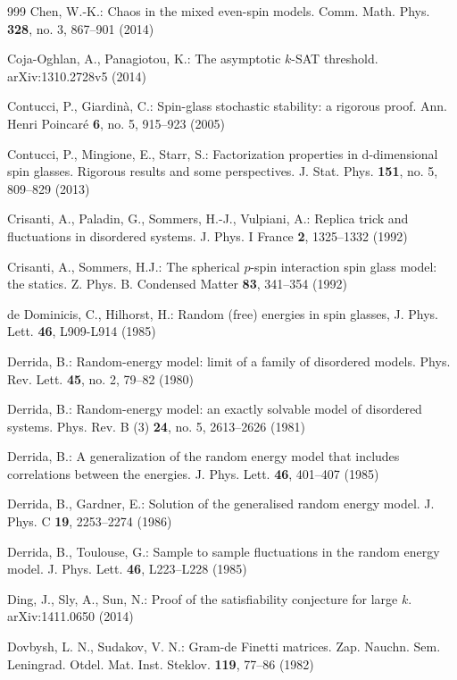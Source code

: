 \documentclass[12pt]{article}
\theoremstyle{nonumberplain}
\begin{document}
\begin{thebibliography}{999}
 Chen, W.-K.: Chaos in the mixed even-spin models. Comm. Math. Phys. \textbf{328}, no. 3, 867--901 (2014)

 Coja-Oghlan, A., Panagiotou, K.: The asymptotic $k$-SAT threshold. arXiv:1310.2728v5 (2014)

 Contucci, P., Giardin\`a, C.: Spin-glass stochastic stability: a rigorous
proof. Ann. Henri Poincar\'e \textbf{6}, no. 5, 915--923 (2005)

 Contucci, P., Mingione, E., Starr, S.: Factorization properties in d-dimensional spin glasses. Rigorous results and some perspectives. J. Stat. Phys. \textbf{151}, no. 5, 809--829  (2013) 

 Crisanti, A., Paladin, G., Sommers, H.-J., Vulpiani, A.: Replica trick and fluctuations in disordered systems. J. Phys. I France \textbf{2}, 1325--1332 (1992)

 Crisanti, A., Sommers, H.J.: The spherical $p$-spin interaction spin glass model: the statics. Z. Phys. B. Condensed Matter \textbf{83}, 341--354 (1992) 

 de Dominicis, C., Hilhorst, H.: Random (free) energies in spin glasses, J. Phys. Lett. \textbf{46}, L909-L914 (1985)

 Derrida, B.: Random-energy model: limit of a family of disordered models. Phys. Rev. Lett. \textbf{45}, no. 2, 79--82 (1980)

 Derrida, B.: Random-energy model: an exactly solvable model of disordered systems. Phys. Rev. B (3) \textbf{24}, no. 5, 2613--2626 (1981)

 Derrida, B.: A generalization of the random energy model that includes correlations between the energies. J. Phys. Lett. \textbf{46}, 401--407 (1985) 

 Derrida, B., Gardner, E.: Solution of the generalised random energy model. J. Phys. C \textbf{19}, 2253--2274 (1986)

 Derrida, B., Toulouse, G.: Sample to sample fluctuations in the random energy model. J. Phys. Lett. \textbf{46}, L223--L228 (1985)

 Ding, J., Sly, A., Sun, N.: Proof of the satisfiability conjecture for large $k$. arXiv:1411.0650 (2014)

 Dovbysh, L. N., Sudakov, V. N.:  Gram-de Finetti matrices. Zap. Nauchn. Sem. Leningrad. Otdel. Mat. Inst. Steklov.  \textbf{119}, 77--86  (1982)


\end{thebibliography}
\end{document}
